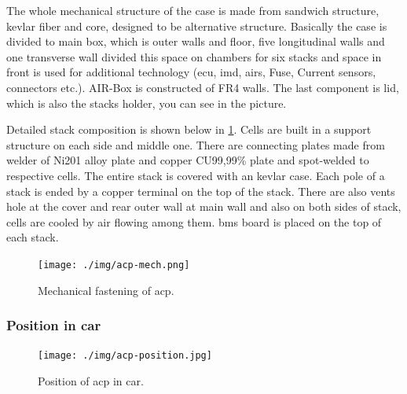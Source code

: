 The whole mechanical structure of the case is made from sandwich structure, kevlar fiber and core, designed to be alternative structure. Basically the case is divided to main box, which is outer walls and floor, five longitudinal walls and one transverse wall divided this space on chambers for six stacks and space in front is used for additional technology (\gls{ecu}, \gls{imd}, \glspl{air}, Fuse, Current sensors, connectors etc.). AIR-Box is constructed of FR4 walls. The last component is lid, which is also the stacks holder, you can see in the picture.

Detailed stack composition is shown below in \ref{fig:acp-mech}. Cells are built in a support structure on each side and middle one. There are connecting plates made from welder of Ni201 alloy plate and copper CU99,99\% plate and spot-welded to respective cells. The entire stack is covered with an kevlar case. Each pole of a stack is ended by a copper terminal on the top of the stack. There are also vents hole at the cover and rear outer wall at main wall and also on both sides of stack, cells are cooled by air flowing among them. \gls{bms} board is placed on the top of each stack.

\begin{figure}[H]
	\centering
	\texttt{[image: ./img/acp-mech.png]}
	\caption{Mechanical fastening of \gls{acp}.}
	\label{fig:acp-mech}
\end{figure}

\subsubsection{Position in car}

\begin{figure}[H]
	\centering
	\texttt{[image: ./img/acp-position.jpg]}
	\caption{Position of \gls{acp} in car.}
	\label{fig:ACP-position}
\end{figure}

